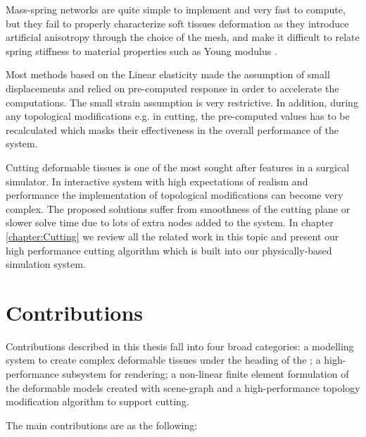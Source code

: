Mass-spring networks are quite simple to implement and very fast to compute, but they fail to properly characterize soft tissues deformation as they 
introduce artificial anisotropy through the choice of the mesh, and make it difficult to relate spring stiffness to material properties such as Young modulus 
\cite{Courtecuisse2010}.

Most methods based on the Linear elasticity made the assumption of small displacements and relied on pre-computed response in order to accelerate the 
computations. The small strain assumption is very restrictive. In addition, during any topological modifications e.g. in cutting, the pre-computed values 
has to be recalculated which masks their effectiveness in the overall performance of the system.

Cutting deformable tissues is one of the most sought after features in a surgical simulator. In interactive system with high expectations of realism and 
performance the implementation of topological modifications can become very complex. The proposed solutions suffer from smoothness of the cutting plane or slower
solve time due to lots of extra nodes added to the system. In chapter \ref{chapter:Cutting} we review all the related work in this topic and present our
high performance cutting algorithm which is built into our physically-based simulation system.


\section{Contributions}
Contributions described in this thesis fall into four broad categories: a modelling system to create complex deformable tissues under the heading of the 
\blob; a high-performance subsystem for rendering; a non-linear finite element formulation of the deformable models created with \blob scene-graph and
a high-performance topology modification algorithm to support cutting. 

The main contributions are as the following:

